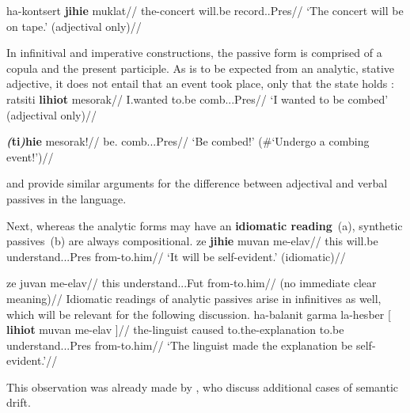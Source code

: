     \a \begingl
        \gla{}ha-kontsert \textbf{jihie} muklat//
        \glb the-concert will.be record..Pres//
        \glft `The concert will be on tape.' (adjectival only)//
    \endgl
\xe

In infinitival and imperative constructions, the passive form is comprised of a copula and the present participle. As is to be expected from an analytic, stative adjective, it does not entail that an event took place, only that the state holds \citep{doron00,kratzer00bls,embick04li}:
\pex \label{ex:analytic-pass}
    \a \begingl
        \gla{}ratsiti \textbf{lihiot} mesorak//
        \glb I.wanted to.be comb...Pres//
        \glft `I wanted to be combed' (adjectival only)//
    \endgl
    
    \a \begingl
        \gla{}\textbf{\emph{(}ti\emph{)}hie} mesorak!//
        \glb be. comb...Pres//
        \glft `Be combed!' (\#`Undergo a combing event!')//
    \endgl
\xe

\cite{horvathsiloni08} and \cite{meltzerasscher11} provide similar arguments for the difference between adjectival and verbal passives in the language. 

Next, whereas the analytic forms may have an \textbf{idiomatic reading}~(\nextx a), synthetic passives~(\nextx b) are always compositional.
\pex \label{ex:idiom}
    \a 
        \begingl
        \gla {}ze \textbf{jihie} muvan me-elav//
        \glb this will.be understand...Pres from-to.him//
        \glft `It will be self-evident.' (idiomatic)//
        \endgl

    \a \ljudge{\#}
        \begingl
        \gla {}ze juvan me-elav//
        \glb this understand...Fut from-to.him//
        \glft (no immediate clear meaning)//
        \endgl
\xe
Idiomatic readings of analytic passives arise in infinitives as well, which will be relevant for the following discussion.
\ex
	\begingl
	\gla ha-balanit garma la-hesber [ \textbf{lihiot} muvan me-elav ]//
	\glb the-linguist caused to.the-explanation to.be understand...Pres from-to.him//
	\glft `The linguist made the explanation be self-evident.'//
	\endgl
\xe

This observation was already made by \cite{horvathsiloni08,horvathsiloni09}, who discuss additional cases of semantic drift.

